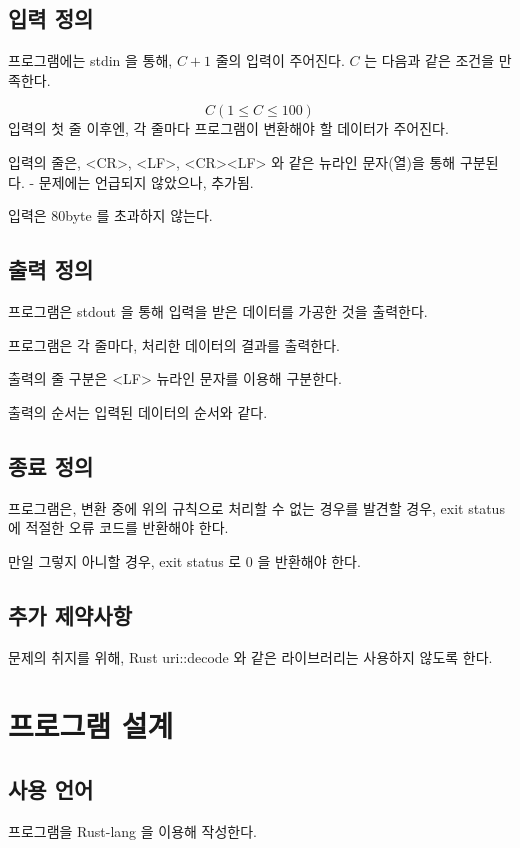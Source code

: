 \documentclass {article}
\begin{document}
\subsection {입력 정의}
프로그램에는 stdin 을 통해, $C + 1$ 줄의 입력이 주어진다. $C$ 는 다음과 같은 조건을 만족한다.

\begin{equation}
  C (1 \le C \le 100)
\end{equation}
\newline
\newline
입력의 첫 줄 이후엔, 각 줄마다 프로그램이 변환해야 할 데이터가 주어진다.

입력의 줄은, <CR>, <LF>, <CR><LF> 와 같은 뉴라인 문자(열)을 통해 구분된다. - 문제에는 언급되지 않았으나, 추가됨.

입력은 80byte 를 초과하지 않는다.

\subsection {출력 정의}
프로그램은 stdout 을 통해 입력을 받은 데이터를 가공한 것을 출력한다.

프로그램은 각 줄마다, 처리한 데이터의 결과를 출력한다.

출력의 줄 구분은 <LF> 뉴라인 문자를 이용해 구분한다.

출력의 순서는 입력된 데이터의 순서와 같다.

\subsection {종료 정의}
프로그램은, 변환 중에 위의 규칙으로 처리할 수 없는 경우를 발견할 경우,
exit status 에 적절한 오류 코드를 반환해야 한다.

만일 그렇지 아니할 경우, exit status 로 0 을 반환해야 한다.

\subsection {추가 제약사항}
문제의 취지를 위해, Rust uri::decode 와 같은 라이브러리는 사용하지 않도록 한다.

\section {프로그램 설계}
\subsection {사용 언어}
프로그램을 Rust-lang 을 이용해 작성한다.
\end{document}
